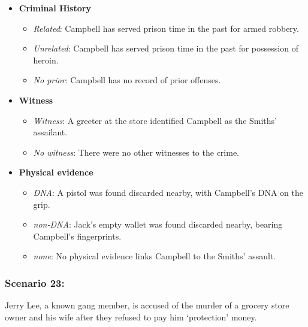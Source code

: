 \documentclass[
]{article}
\providecommand{\tightlist}{%
  \setlength{\itemsep}{0pt}\setlength{\parskip}{0pt}}
\begin{document}
\begin{itemize}
\tightlist
\item
  \textbf{Criminal History}

  \begin{itemize}
  \tightlist
  \item
    \emph{Related}: Campbell has served prison time in the past for
    armed robbery.
  \item
    \emph{Unrelated}: Campbell has served prison time in the past for
    possession of heroin.
  \item
    \emph{No prior}: Campbell has no record of prior offenses.
  \end{itemize}
\item
  \textbf{Witness}

  \begin{itemize}
  \tightlist
  \item
    \emph{Witness}: A greeter at the store identified Campbell as the
    Smiths' assailant.
  \item
    \emph{No witness}: There were no other witnesses to the crime.
  \end{itemize}
\item
  \textbf{Physical evidence}

  \begin{itemize}
  \tightlist
  \item
    \emph{DNA}: A pistol was found discarded nearby, with Campbell's DNA
    on the grip.
  \item
    \emph{non-DNA}: Jack's empty wallet was found discarded nearby,
    bearing Campbell's fingerprints.
  \item
    \emph{none}: No physical evidence links Campbell to the Smiths'
    assault.
  \end{itemize}
\end{itemize}

\hypertarget{scenario-23}{%
\subsubsection{Scenario 23:}\label{scenario-23}}

Jerry Lee, a known gang member, is accused of the murder of a grocery
store owner and his wife after they refused to pay him `protection'
money.
\end{document}

